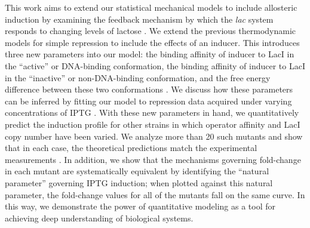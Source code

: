 This work aims to extend our statistical mechanical models to include
allosteric induction by examining the
feedback mechanism by which the \textit{lac} system responds to changing levels
of lactose \cite{JACOB1961} . We extend the previous thermodynamic models for
simple repression to include the effects of an inducer. This introduces three
new parameters into our model: the binding affinity of inducer to LacI in the
``active'' or DNA-binding conformation, the binding affinity of inducer to LacI
in the ``inactive'' or non-DNA-binding conformation, and the free energy
difference between these two conformations . We discuss how these parameters can
be inferred by fitting our model to repression data acquired under varying
concentrations of IPTG . With these new parameters in hand, we quantitatively
predict the induction profile for other strains in which operator affinity and
LacI copy number have been varied. We analyze more than 20 such mutants and show
that in each case, the theoretical predictions match the experimental
measurements . In addition, we show that the mechanisms governing fold-change in
each mutant are systematically equivalent by identifying the ``natural
parameter'' governing IPTG induction; when plotted against this natural
parameter, the fold-change values for all of the mutants fall on the same curve.
In this way, we demonstrate the power of quantitative modeling as a tool for
achieving deep understanding of biological systems.  
